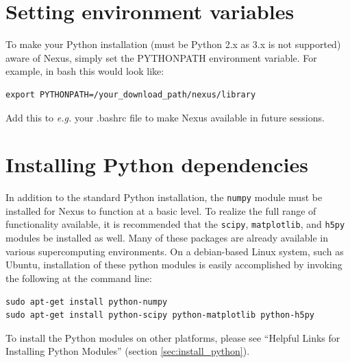 \documentclass[oneside,11pt]{memoir}
\numberwithin{equation}{section}
\begin{document}


\section{Setting environment variables}
To make your Python installation (must be Python 2.x as 3.x is not supported) 
aware of Nexus, simply set the PYTHONPATH environment variable.  For example, in bash this would look like:
\begin{shaded}
\begin{verbatim}
export PYTHONPATH=/your_download_path/nexus/library
\end{verbatim}
\end{shaded}
\noindent
Add this to \emph{e.g.} your .bashrc file to make Nexus available 
in future sessions.

\section{Installing Python dependencies}
In addition to the standard Python installation, the \texttt{numpy} module must 
be installed for Nexus to function at a basic level.  To realize 
the full range of functionality available, it is recommended that the 
\texttt{scipy}, \texttt{matplotlib}, and \texttt{h5py} modules be installed as 
well.  Many of these packages are already available in various supercomputing 
environments.  On a debian-based Linux system, such as Ubuntu, installation of 
these python modules is easily accomplished by invoking the following at the 
command line:
\begin{shaded}
\begin{verbatim}
sudo apt-get install python-numpy
sudo apt-get install python-scipy python-matplotlib python-h5py 
\end{verbatim}
\end{shaded}
\noindent
To install the Python modules on other platforms, please see 
``Helpful Links for Installing Python Modules'' (section \ref{sec:install_python}).
\end{document}
